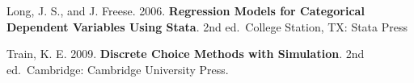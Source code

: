 \documentclass[11pt]{article}
\makeatletter
\newcommand{\boxspacing}{\kern\kvtcb@left@rule\kern\kvtcb@boxsep}
\newcommand{\prompt}[4]{
        {\ttfamily\llap{{\color{#2}[#3]:\hspace{3pt}#4}}\vspace{-\baselineskip}}
    }
\makeatother
\begin{document}
Long, J. S., and J. Freese. 2006. \textbf{Regression Models for
Categorical Dependent Variables Using Stata}. 2nd ed.~College Station,
TX: Stata Press

Train, K. E. 2009. \textbf{Discrete Choice Methods with Simulation}. 2nd
ed.~Cambridge: Cambridge University Press.

    \begin{tcolorbox}[breakable, size=fbox, boxrule=1pt, pad at break*=1mm,colback=cellbackground, colframe=cellborder]
\prompt{In}{incolor}{ }{\boxspacing}
\begin{Verbatim}[commandchars=\\\{\}]

\end{Verbatim}
\end{tcolorbox}


    
    
    
\end{document}
